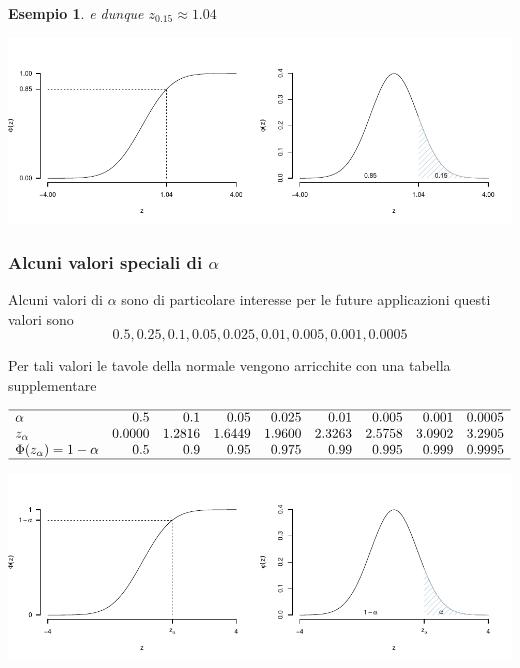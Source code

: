 \documentclass[
  11pt,
]{book}
\theoremstyle{mytheoremstyle}
\theoremstyle{mydefstyle}
\newtheorem{example}{{Esempio}}[section]
\begin{document}
\begin{example}
e dunque \(z_{0.15}\approx 1.04\)

\begin{center}\includegraphics{Appunti_di_Statistica_2025_files/figure-latex/07c-Normale-29-1} \end{center}

\end{example}

\subsubsection{\texorpdfstring{Alcuni valori speciali di \(\alpha\)}{Alcuni valori speciali di \textbackslash alpha}}\label{alcuni-valori-speciali-di-alpha}

Alcuni valori di \(\alpha\) sono di particolare interesse per le future applicazioni questi valori sono
\[0.5,  0.25,   0.1,    0.05,   0.025,  0.01,   0.005,  0.001,  0.0005\]

Per tali valori le tavole della normale vengono arricchite con una tabella supplementare

\[\begin{array}{lrrrrrrrr}
\hline
\alpha & 0.5 & 0.1 & 0.05 & 0.025 & 0.01 & 0.005 & 0.001 & 0.0005 \\
z_\alpha & 0.0000 & 1.2816 & 1.6449 & 1.9600 & 2.3263 & 2.5758 & 3.0902 & 3.2905 \\
\Phi(z_\alpha)=1-\alpha & 0.5 & 0.9 & 0.95 & 0.975 & 0.99 & 0.995 & 0.999 & 0.9995 \\
\hline
\end{array}\]

\begin{center}\includegraphics{Appunti_di_Statistica_2025_files/figure-latex/07c-Normale-30-1} \end{center}
\end{document}
